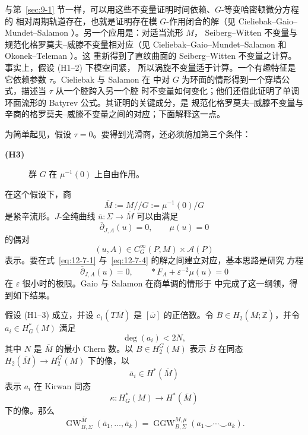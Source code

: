 与第~\ref{sec:9-1} 节一样，可以用这些不变量证明时间依赖、$G$-等变哈密顿微分方程的
相对周期轨道存在，也就是证明存在模 $G$-作用闭合的解（见
Cieliebak--Gaio--Mundet--Salamon ）。另一个应用是：对适当流形 $M$，
Seiberg--Witten 不变量与规范化格罗莫夫--威滕不变量相对应（见
Cieliebak--Gaio--Mundet--Salamon  和 Okonek--Teleman ）。这
重新得到了直纹曲面的 Seiberg--Witten 不变量之计算。事实上，假设 (H1--2) 下模空间紧，
所以涡旋不变量适于计算。一个有趣特征是它依赖参数 $\tau$。Cieliebak 与 Salamon 在
 中对 $G$ 为环面的情形得到一个穿墙公式，描述当 $\tau$ 从一个腔跨入另一个腔
时不变量如何变化；他们还借此证明了单调环面流形的 Batyrev 公式。其证明的关键成分，是
规范化格罗莫夫--威滕不变量与辛商的格罗莫夫--威滕不变量之间的对应；下面解释这一点。

为简单起见，假设 $\tau=0$。要得到光滑商，还必须施加第三个条件：

\begin{description}
\item[\normalfont\textbf{(H3)}]
群 $G$ 在 $\mu^{-1}(0)$ 上自由作用。
\end{description}

在这个假设下，商
\[
  \overline M:=M/\!/G:=\mu^{-1}(0)/G
\]
是紧辛流形。$J$-全纯曲线 $\overline u:\Sigma\to\overline M$ 可以由满足
\begin{equation}\label{eq:12-7-4}
  \overline\partial_{J,A}(u)=0,
  \qquad \mu(u)=0
\end{equation}
的偶对
\[
  (u,A)\in C_G^\infty(P,M)\times\mathcal A(P)
\]
表示。要在式~\eqref{eq:12-7-1} 与~\eqref{eq:12-7-4} 的解之间建立对应，基本思路是研究
方程
\begin{equation}\label{eq:12-7-5}
  \overline\partial_{J,A}(u)=0,
  \qquad *F_A+\varepsilon^{-2}\mu(u)=0
\end{equation}
在 $\varepsilon$ 很小时的极限。Gaio 与 Salamon 在商单调的情形于 
中完成了这一纲领，得到如下结果。

\begin{theorem}\label{thm:12-7-2}
假设 (H1--3) 成立，并设 $c_1(T\overline M)$ 是 $[\overline\omega]$ 的正倍数。令
$\overline B\in H_2(\overline M;\mathbb Z)$，并令
$a_i\in H_G^*(M)$ 满足
\[
  \deg(a_i)<2N,
\]
其中 $N$ 是 $\overline M$ 的最小 Chern 数。以 $B\in H_2^G(M)$ 表示
$\overline B$ 在同态 $H_2(\overline M)\to H_2^G(M)$ 下的像，以
\[
  \overline a_i\in H^*(\overline M)
\]
表示 $a_i$ 在 Kirwan 同态
\[
  \kappa:H_G^*(M)\longrightarrow H^*(\overline M)
\]
下的像。那么
\[
  \operatorname{GW}^{\overline M}_{\overline B,\Sigma}
  (\overline a_1,\ldots,\overline a_k)
  =\operatorname{GGW}^{M,\mu}_{B,\Sigma}
  (a_1\smile\cdots\smile a_k).
\]
\end{theorem}

